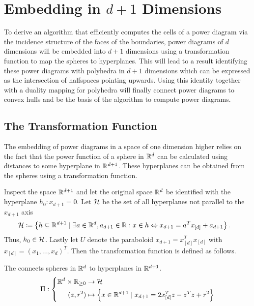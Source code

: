 \section{Embedding in \texorpdfstring{$d+1$}{d+1} Dimensions}
\label{sec:embedding_in_d_1_dimensions}
To derive an algorithm that efficiently computes the cells of a power diagram via the incidence structure of the faces of the boundaries, power diagrams of $d$ dimensions will be embedded into $d+1$ dimensions using a transformation function to map the spheres to hyperplanes.
This will lead to a result identifying these power diagrams with polyhedra in $d+1$ dimensions which can be expressed as the intersection of halfspaces pointing upwards.
Using this identity together with a duality mapping for polyhedra will finally connect power diagrams to convex hulls and be the basis of the algorithm to compute power diagrams.

\subsection{The Transformation Function}
\label{sub:the_transform}
The embedding of power diagrams in a space of one dimension higher relies on the fact that the power function of a sphere in $\mathbb{R}^d$ can be calculated using distances to some hyperplane in $\mathbb{R}^{d+1}$.
These hyperplanes can be obtained from the spheres using a transformation function.

Inspect the space $\mathbb{R}^{d+1}$ and let the original space $\mathbb{R}^d$ be identified with the hyperplane $h_0: x_{d+1} = 0$.
Let $\mathcal{H}$ be the set of all hyperplanes not parallel to the $x_{d+1}$ axis
\begin{align}
    \mathcal{H} &\coloneqq \left\{ h \subseteq \mathbb{R}^{d+1} \mid \exists a \in \mathbb{R}^d, a_{d+1} \in \mathbb{R} : x \in h \Leftrightarrow x_{d+1} = a^Tx_{[d]} + a_{d+1} \right\}.
\end{align}
Thus, $h_0 \in \mathcal{H}$.
Lastly let $U$ denote the paraboloid $x_{d+1} = x_{[d]}^Tx_{[d]}$ with $x_{[d]} = \left( x_1, \dots, x_d \right)^T$.
Then the transformation function is defined as follows.

\begin{definition}
    The  connects spheres in $\mathbb{R}^d$ to hyperplanes in $\mathbb{R}^{d+1}$.
    \begin{align}
        \Pi: \left\{\begin{aligned}
            \mathbb{R}^{d} \times \mathbb{R}_{\geq 0} &\to \mathcal{H}\\
            (z, r^2) &\mapsto \left\{ x \in \mathbb{R}^{d+1} \mid x_{d+1} = 2x_{[d]}^Tz - z^Tz + r^2 \right\}
        \end{aligned}\right.
    \end{align}
\end{definition}


